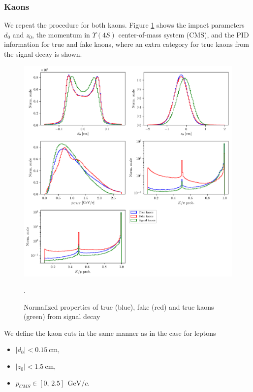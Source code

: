 \documentclass[  headings=standardclasses,
  headings=big,oneside,a4paper,openany,12pt]{scrbook}
\newcommand {\e}[1]{\mathrm{~#1}}
\begin{document}
\subsubsection{Kaons}

We repeat the procedure for both kaons. Figure \ref{fig:Kvars} shows the impact parameters $d_0$ and $z_0$, the momentum in  $\Upsilon(4S)$ center-of-mass system (CMS), and the PID information for true and fake kaons, where an extra category for true kaons from the signal decay is shown.

\begin{figure}[H]
\centering
\includegraphics[width=\linewidth]{fig/FSP_kaon_vars}
\captionsetup{width=.8\linewidth}
\caption{Normalized properties of true (blue), fake (red) and true kaons (green) from signal decay}.
\label{fig:Kvars}
\end{figure}

We define the kaon cuts in the same manner as in the case for leptons
\begin{itemize}
\item $\vert d_0 \vert < 0.15\e{cm}$,
\item $\vert z_0 \vert < 1.5\e{cm}$,
\item $p_{CMS} \in [0,\,2.5]~\e{GeV}/c$.
\end{itemize}
\end{document}
